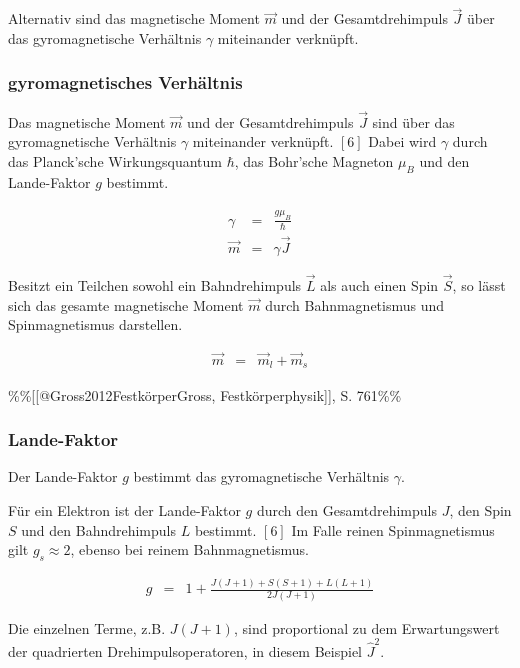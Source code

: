 \documentclass[12pt,a4paper]{scrartcl}
\numberwithin{equation}{section} %
\renewcommand{\[}{} %
\renewcommand{\]}{\noindent} %
\begin{document}
Alternativ sind das magnetische Moment \(\vec{m}\) und der
Gesamtdrehimpuls \(\vec{J}\) über das gyromagnetische Verhältnis
\(\gamma\) miteinander verknüpft.

\hypertarget{gyromagnetisches-verhuxe4ltnis}{%
\subsubsection{gyromagnetisches
Verhältnis}\label{gyromagnetisches-verhuxe4ltnis}}

Das magnetische Moment \(\vec{m}\) und der Gesamtdrehimpuls \(\vec{J}\)
sind über das gyromagnetische Verhältnis \(\gamma\) miteinander
verknüpft. \([6]\) Dabei wird \(\gamma\) durch das Planck'sche
Wirkungsquantum \(\hbar\), das Bohr'sche Magneton \(\mu_{B}\) und den
Lande-Faktor \(g\) bestimmt.

\[
\begin{eqnarray}
    \gamma &=& \frac{g\mu_B}{\hbar} \\
    \vec{m} &=& \gamma \vec{J}
\end{eqnarray}
\]

Besitzt ein Teilchen sowohl ein Bahndrehimpuls \(\vec L\) als auch einen
Spin \(\vec S\), so lässt sich das gesamte magnetische Moment
\(\vec{m}\) durch Bahnmagnetismus und Spinmagnetismus darstellen.

\[
\begin{eqnarray}
    \vec m &=& \vec m_l + \vec m_s
\end{eqnarray}
\]

\%\%{[}{[}@Gross2012Festkörper\textbar Gross, Festkörperphysik{]}{]}, S.
761\%\%

\hypertarget{lande-faktor}{%
\subsubsection{Lande-Faktor}\label{lande-faktor}}

Der Lande-Faktor \(g\) bestimmt das gyromagnetische Verhältnis
\(\gamma\).

Für ein Elektron ist der Lande-Faktor \(g\) durch den Gesamtdrehimpuls
\(J\), den Spin \(S\) und den Bahndrehimpuls \(L\) bestimmt. \([6]\) Im
Falle reinen Spinmagnetismus gilt \(g_{s} \approx 2\), ebenso bei reinem
Bahnmagnetismus.

\[
\begin{eqnarray}
    g &=& 1 + \frac{J(J+1) + S(S+1) + L(L+1)}{2J(J+1)}
\end{eqnarray}
\]

Die einzelnen Terme, z.B. \(J(J+1)\), sind proportional zu dem
Erwartungswert der quadrierten Drehimpulsoperatoren, in diesem Beispiel
\(\hat J^2\).
\end{document}
